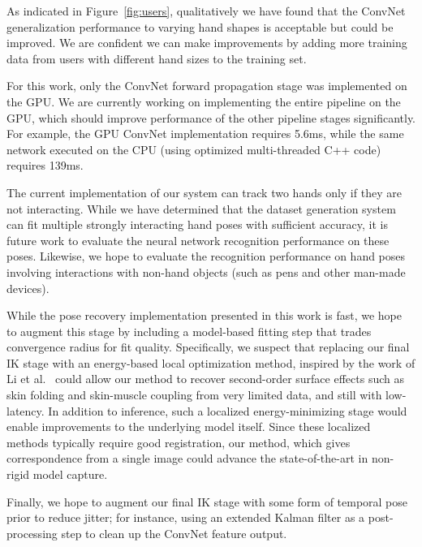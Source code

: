 As indicated in Figure~\ref{fig:users}, qualitatively we have found that the ConvNet generalization performance to varying hand shapes is acceptable but could be improved. We are confident we can make improvements by adding more training data from users with different hand sizes to the training set.

For this work, only the ConvNet forward propagation stage was implemented on the GPU. We are currently working on implementing the entire pipeline on the GPU, which should improve performance of the other pipeline stages significantly. For example, the GPU ConvNet implementation requires 5.6ms, while the same network executed on the CPU (using optimized multi-threaded C++ code) requires 139ms.

The current implementation of our system can track two hands only if they are not interacting. While we have determined that the dataset generation system can fit multiple strongly interacting hand poses with sufficient accuracy, it is future work to evaluate the neural network recognition performance on these poses. Likewise, we hope to evaluate the recognition performance on hand poses involving interactions with non-hand objects (such as pens and other man-made devices).

While the pose recovery implementation presented in this work is fast, we hope to augment this stage by including a model-based fitting step that trades convergence radius for fit quality. Specifically, we suspect that replacing our final IK stage with an energy-based local optimization method, inspired by the work of Li et al.~\cite{li08global} could allow our method to recover second-order surface effects such as skin folding and skin-muscle coupling from very limited data, and still with low-latency. In addition to inference, such a localized energy-minimizing stage would enable improvements to the underlying model itself. Since these localized methods typically require good registration, our method, which gives correspondence from a single image could advance the state-of-the-art in non-rigid model capture.

Finally, we hope to augment our final IK stage with some form of temporal pose prior to reduce jitter; for instance, using an extended Kalman filter as a post-processing step to clean up the ConvNet feature output.
